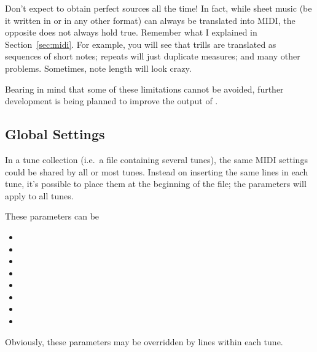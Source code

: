 \documentclass[a4paper,12pt]{book}
\begin{document}
Don't expect to obtain perfect sources all the time! In fact, while
sheet music (be it written in \ABC{} or in any other format) can
always be translated into MIDI, the opposite does not always hold
true. Remember what I explained in Section~\ref{sec:midi}. For
example, you will see that trills are translated as sequences of short
notes; repeats will just duplicate measures; and many other problems.
Sometimes, note length will look crazy.

Bearing in mind that some of these limitations cannot be avoided, further
development is being planned to improve the output of .


\subsection{Global Settings}

In a tune collection (i.e.\ a file containing several tunes), the same MIDI
settings could be shared by all or most tunes. Instead on inserting the same
 lines in each tune, it's possible to place them at the
beginning of the file; the parameters will apply to all tunes.

These parameters can be 

\begin{itemize}

  \item {}
  \item {}
  \item {}
  \item {}
  \item {}
  \item {}
  \item {}
  \item {}
  
\end{itemize}

Obviously, these parameters may be overridden by  lines within
each tune.



\end{document}
